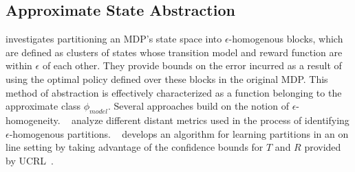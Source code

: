 \documentclass{article}
\begin{document}
%
%
%


\subsection{Approximate State Abstraction}
\citep{dean1997model} investigates partitioning an MDP's state space into $\epsilon$-homogenous blocks, which are defined as clusters of states whose transition model and reward function are within $\epsilon$ of each other. They provide bounds on the error incurred as a result of using the optimal policy defined over these blocks in the original MDP. This method of abstraction is effectively characterized as a function belonging to the approximate class $\phi_{model}$.
Several approaches build on the notion of $\epsilon$-homogeneity. ~\citep{even2003approximate} analyze different distant metrics used in the process of identifying $\epsilon$-homogenous partitions. ~\cite{ortner2013adaptive} develops an algorithm for learning partitions in an on line setting by taking advantage of the confidence bounds for $T$ and $R$ provided by UCRL~\cite{auer2009near}.
\end{document}

